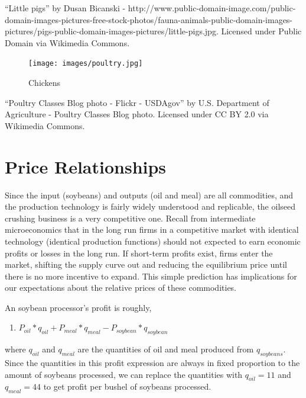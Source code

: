 \documentclass[
  letterpaper,
  DIV=11,
  numbers=noendperiod]{scrreprt}
\providecommand{\tightlist}{%
  \setlength{\itemsep}{0pt}\setlength{\parskip}{0pt}}\usepackage{longtable,booktabs,array}
\begin{document}
``Little pigs'' by Dusan Bicanski -
http://www.public-domain-image.com/public-domain-images-pictures-free-stock-photos/fauna-animals-public-domain-images-pictures/pigs-public-domain-images-pictures/little-pigs.jpg.
Licensed under Public Domain via Wikimedia Commons.

\begin{figure}[H]

{\centering \texttt{[image: images/poultry.jpg]}

}

\caption{Chickens}

\end{figure}%

``Poultry Classes Blog photo - Flickr - USDAgov'' by U.S. Department of
Agriculture - Poultry Classes Blog photo. Licensed under CC BY 2.0 via
Wikimedia Commons.

\section{Price Relationships}\label{price-relationships}

Since the input (soybeans) and outputs (oil and meal) are all
commodities, and the production technology is fairly widely understood
and replicable, the oilseed crushing business is a very competitive one.
Recall from intermediate microeconomics that in the long run firms in a
competitive market with identical technology (identical production
functions) should not expected to earn economic profits or losses in the
long run. If short-term profits exist, firms enter the market, shifting
the supply curve out and reducing the equilibrium price until there is
no more incentive to expand. This simple prediction has implications for
our expectations about the relative prices of these commodities.

An soybean processor's profit is roughly,

\begin{enumerate}
\def\labelenumi{\arabic{enumi}.}
\tightlist
\item
  \(P_{oil}*q_{oil} + P_{meal}*q_{meal} - P_{soybean}*q_{soybean}\)
\end{enumerate}

where \(q_{oil}\) and \(q_{meal}\) are the quantities of oil and meal
produced from \(q_{soybeans}\). Since the quantities in this profit
expression are always in fixed proportion to the amount of soybeans
processed, we can replace the quantities with \(q_{oil} = 11\) and
\(q_{meal} = 44\) to get profit per bushel of soybeans processed.
\end{document}
